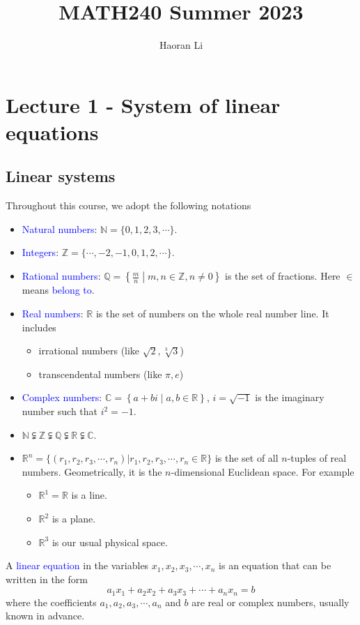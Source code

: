 \documentclass[a4paper,10pt]{article}
\title{MATH240 Summer 2023} %
\author{Haoran Li}
\date{}
\begin{document}
\maketitle
\tableofcontents
\newpage

\section{Lecture 1 - System of linear equations}


\subsection{Linear systems}

Throughout this course, we adopt the following notations
\begin{itemize}
\item \textcolor{blue}{Natural numbers}: $\mathbb N=\{0,1,2,3,\cdots\}$.
\item \textcolor{blue}{Integers}: $\mathbb Z=\{\cdots,-2,-1,0,1,2,\cdots\}$.
\item \textcolor{blue}{Rational numbers}: $\mathbb Q=\left\{\frac{m}{n}\middle|m,n\in\mathbb Z,n\neq0\right\}$ is the set of fractions. Here $\in$ means \textcolor{blue}{belong to}.
\item \textcolor{blue}{Real numbers}: $\mathbb R$ is the set of numbers on the whole real number line. It includes
\begin{itemize}
\item irrational numbers (like $\sqrt{2},\sqrt[3]{3}$) 
\item transcendental numbers (like $\pi,e$)
\end{itemize}
\item \textcolor{blue}{Complex numbers}: $\mathbb C=\left\{a+bi\middle|a,b\in\mathbb R\right\}$, $i=\sqrt{-1}$ is the imaginary number such that $i^2=-1$.
\item $\mathbb N\subsetneqq\mathbb Z\subsetneqq\mathbb Q\subsetneqq\mathbb R\subsetneqq\mathbb C$.
\item $\mathbb R^n=\{(r_1,r_2,r_3,\cdots,r_n)|r_1,r_2,r_3,\cdots,r_n\in\mathbb R\}$ is the set of all $n$-tuples of real numbers. Geometrically, it is the $n$-dimensional Euclidean space. For example
\begin{itemize}
\item $\mathbb R^1=\mathbb R$ is a line.
\item $\mathbb R^2$ is a plane.
\item $\mathbb R^3$ is our usual physical space.
\end{itemize}
\end{itemize}

\begin{definition}
A \textcolor{blue}{linear equation} in the variables $x_1,x_2,x_3,\cdots,x_n$ is an equation that can be written in the form 
\begin{equation}\label{14:02-05/31/2022}
a_1x_1+a_2x_2+a_3x_3+\cdots+a_nx_n=b
\end{equation}
where the coefficients $a_1,a_2,a_3,\cdots,a_n$ and $b$ are real or complex numbers, usually known in advance.
\end{definition}
\end{document}
